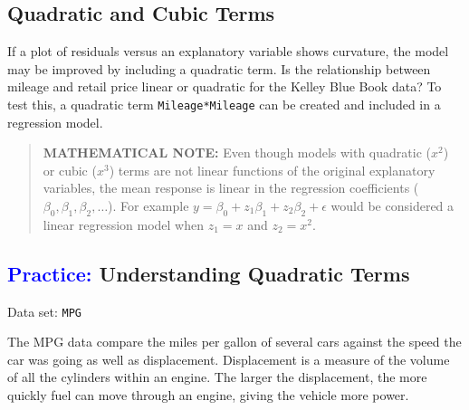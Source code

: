 \documentclass[
]{report}
\begin{document}
\hypertarget{quadratic-and-cubic-terms}{%
\subsection*{Quadratic and Cubic Terms}\label{quadratic-and-cubic-terms}}

If a plot of residuals versus an explanatory variable shows curvature, the model may be improved by including a quadratic term. Is the relationship between mileage and retail price linear or quadratic for the Kelley Blue Book data? To test this, a quadratic term \texttt{Mileage*Mileage} can be created and included in a regression model.

\begin{quote}
\textbf{MATHEMATICAL NOTE:} Even though models with quadratic (\(\scriptstyle x^2\)) or cubic (\(\scriptstyle x^3\)) terms are not linear functions of the original explanatory variables, the mean response is linear in the regression coefficients (\(\scriptstyle \beta_0, \beta_1, \beta_2, \dots\)). For example \(\scriptstyle y = \beta_0 + z_1 \beta_1 + z_2 \beta_2 + \epsilon\) would be considered a linear regression model when \(\scriptstyle z_1 = x\) and \(\scriptstyle z_2 = x^2\).
\end{quote}

\hypertarget{understanding-quadratic-terms}{%
\subsection*{\texorpdfstring{\textcolor{blue}{Practice:} Understanding Quadratic Terms}{ Understanding Quadratic Terms}}\label{understanding-quadratic-terms}}

Data set: \texttt{MPG}

The MPG data compare the miles per gallon of several cars against the speed the car was going as well as displacement. Displacement is a measure of the volume of all the cylinders within an engine. The larger the displacement, the more quickly fuel can move through an engine, giving the vehicle more power.
\end{document}
